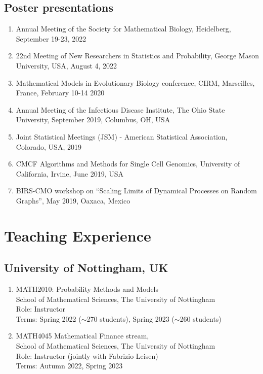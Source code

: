 \documentclass[11pt,a4paper,sans]{moderncv}        %
\begin{document}
\subsection{Poster presentations}
\begin{enumerate}
	\item Annual Meeting of the Society for Mathematical Biology, Heidelberg, September 19-23, 2022
	\item 22nd Meeting of New Researchers in Statistics and Probability, George Mason University, USA, August 4, 2022
	\item {Mathematical Models in Evolutionary Biology conference, CIRM, Marseilles, France, February 10-14 2020}
	\item{Annual Meeting of the Infectious Disease Institute, The Ohio State University, September 2019, Columbus, OH, USA}
	\item{Joint Statistical Meetings (JSM) - American Statistical Association, Colorado, USA, 2019} 
	\item {CMCF Algorithms and Methods for Single Cell Genomics, University of California, Irvine, June 2019, USA}
	\item {BIRS-CMO workshop on ``Scaling Limits of Dynamical Processes on Random Graphs'', May 2019, Oaxaca, Mexico}
\end{enumerate}

\section{Teaching Experience}
\subsection{University of Nottingham, UK}
\begin{enumerate}
	\item MATH2010: Probability Methods and Models \\School of Mathematical Sciences, The University of Nottingham\\Role: Instructor\\Terms: Spring 2022 ($\sim$270 students), Spring 2023 ($\sim$260 students)
	\item MATH4045 Mathematical Finance stream, \\School of Mathematical Sciences, The University of Nottingham\\Role: Instructor (jointly with Fabrizio Leisen)\\Terms: Autumn 2022, Spring 2023
\end{enumerate}
\end{document}

